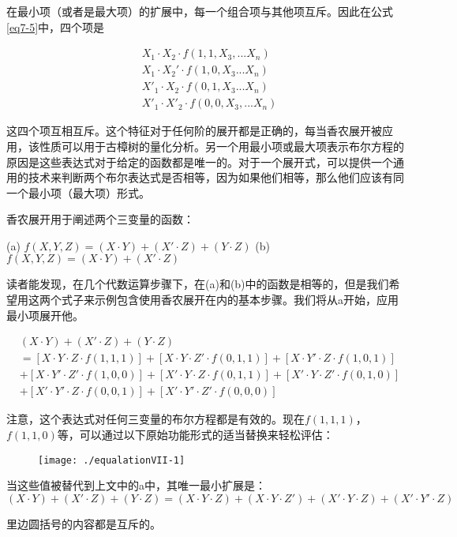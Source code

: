 \documentclass[cn,11pt,chinese]{elegantbook}
\begin{document}
{在最小项（或者是最大项）的扩展中，每一个组合项与其他项互斥。因此在公式\ref{eq7-5}中，四个项是


\begin{align*}
& X_1\cdot X_2\cdot f(1,1,X_3,...X_n) \\
& X_1\cdot X_2'\cdot f(1,0,X_3...X_n) \\
& X'_1\cdot X_2 \cdot f(0,1,X_3...X_n)    \\
& X'_1 \cdot X'_2\cdot f(0,0,X_3,...X_n)
\end{align*}

这四个项互相互斥。这个特征对于任何阶的展开都是正确的，每当香农展开被应用，该性质可以用于古樟树的量化分析。另一个用最小项或最大项表示布尔方程的原因是这些表达式对于给定的函数都是唯一的。对于一个展开式，可以提供一个通用的技术来判断两个布尔表达式是否相等，因为如果他们相等，那么他们应该有同一个最小项（最大项）形式。

香农展开用于阐述两个三变量的函数：

(a) $f(X,Y,Z)=(X\cdot Y)+(X'\cdot Z)+(Y\cdot Z) $    
(b) $f(X,Y,Z)=(X\cdot Y)+(X'\cdot Z)$    

读者能发现，在几个代数运算步骤下，在(a)和(b)中的函数是相等的，但是我们希望用这两个式子来示例包含使用香农展开在内的基本步骤。我们将从a开始，应用最小项展开他。


\begin{align}
\label{eq7-7}
& (X\cdot Y)+(X' \cdot Z)+(Y\cdot Z)  \nonumber\\
& = [X\cdot Y\cdot Z\cdot f(1,1,1)]+[X\cdot Y\cdot Z'\cdot f(0,1,1)]+[X\cdot Y'\cdot Z\cdot f(1,0,1)]   \nonumber\\
& + [X\cdot Y'\cdot Z' \cdot f(1,0,0)]+[X'\cdot Y\cdot Z\cdot f(0,1,1)]+[X'\cdot Y\cdot Z'\cdot f(0,1,0)] \nonumber\\
& +[X'\cdot Y'\cdot Z\cdot f(0,0,1)]+[X'\cdot Y'\cdot Z'\cdot f(0,0,0)]
\end{align}

注意，这个表达式对任何三变量的布尔方程都是有效的。现在$f(1,1,1)$，$f(1,1,0)$等，可以通过以下原始功能形式的适当替换来轻松评估：

\begin{figure}[H]
	\texttt{[image: ./equalationVII-1]}
\end{figure}


当这些值被替代到上文中的a中，其唯一最小扩展是：
$$(X\cdot Y)+(X'\cdot Z)+(Y\cdot Z)=(X\cdot Y\cdot Z)+(X\cdot Y\cdot Z')+(X'\cdot Y\cdot Z)+(X'\cdot Y'\cdot Z)$$

里边圆括号的内容都是互斥的。

}
\end{document}
